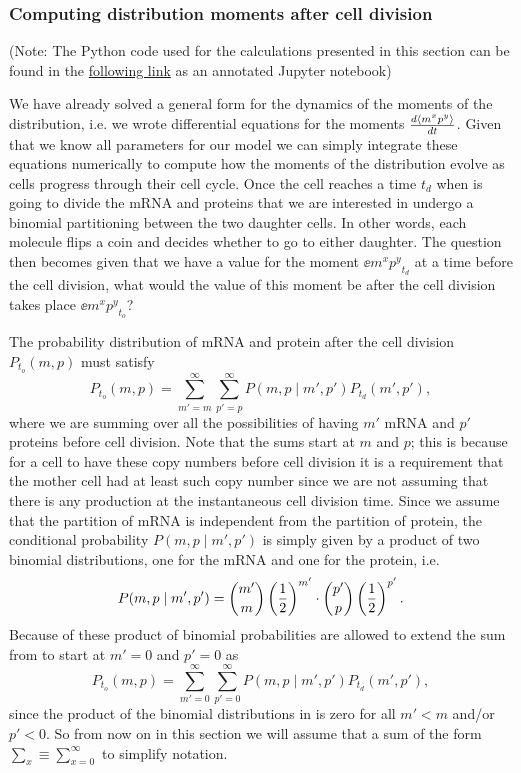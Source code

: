 \subsubsection{Computing distribution moments after cell division}

(Note: The Python code used for the calculations presented in this section can
be found in the
\href{https://www.rpgroup.caltech.edu//chann_cap/software/binomial_moments.html}{following
link} as an annotated Jupyter notebook)

We have already solved a general form for the dynamics of the moments of the
distribution, i.e. we wrote differential equations for the moments ${d\left\langle m^x
p^y \right\rangle\over dt}$. Given that we know all parameters for our model we can simply
integrate these equations numerically to compute how the moments of the
distribution evolve as cells progress through their cell cycle. Once the cell
reaches a time $t_d$ when is going to divide the mRNA and proteins that we are
interested in undergo a binomial partitioning between the two daughter cells.
In other words, each molecule flips a coin and decides whether to go to either
daughter. The question then becomes given that we have a value for the moment
$\ee{m^x p^y}_{t_d}$ at a time before the cell division, what would the value
of this moment be after the cell division takes place $\ee{m^x p^y}_{t_o}$?

The probability distribution of mRNA and protein after the cell division
$P_{t_o}(m, p)$ must satisfy
\begin{equation}
  P_{t_o}(m, p) = \sum_{m'=m}^\infty \sum_{p'=p}^\infty 
                  P(m, p \mid m', p') P_{t_d}(m', p'),
\label{eq_dist_post_div}
\end{equation}
where we are summing over all the possibilities of having $m'$ mRNA and $p'$
proteins before cell division. Note that the sums start at $m$ and $p$; this is
because for a cell to have these copy numbers before cell division it is a
requirement that the mother cell had at least such copy number since we are not
assuming that there is any production at the instantaneous cell division time.
Since we assume that the partition of mRNA is independent from the partition of
protein, the conditional probability $P(m, p \mid m', p')$ is simply given by a
product of two binomial distributions, one for the mRNA and one for the
protein, i.e.
\begin{equation}
P(m, p \mid m', p') = {m' \choose m} \left( {1 \over 2} \right)^{m'} \cdot
                      {p' \choose p} \left( {1 \over 2} \right)^{p'}.
\label{eq_binom_prod}
\end{equation}
Because of these product of binomial probabilities are allowed to extend the
sum from
 to start at $m'=0$ and $p'=0$ as
\begin{equation}
  P_{t_o}(m, p) = \sum_{m'=0}^\infty \sum_{p'=0}^\infty 
                  P(m, p \mid m', p') P_{t_d}(m', p'),
\end{equation}
since the product of the binomial distributions in  is zero
for all $m' < m$ and/or $p' < 0$. So from now on in this section we will assume
that a sum of the form $\sum_x \equiv \sum_{x=0}^\infty$ to simplify notation.

